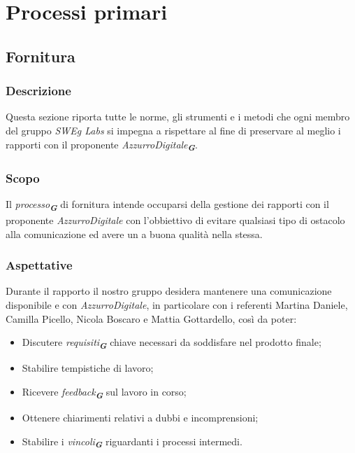 

\section{Processi primari}
\label{sec:processi_primari}
\subsection{Fornitura}
\subsubsection{Descrizione}
Questa sezione riporta tutte le norme, gli strumenti e i metodi che ogni membro del gruppo \emph{SWEg Labs} si impegna a rispettare al fine di preservare al meglio i rapporti con il proponente \emph{AzzurroDigitale}\textsubscript{\textit{\textbf{G}}}.
\subsubsection{Scopo}
Il \emph{processo}\textsubscript{\textit{\textbf{G}}} di fornitura intende occuparsi della gestione dei rapporti con il proponente \emph{AzzurroDigitale} con l’obbiettivo di evitare qualsiasi tipo di ostacolo alla comunicazione ed avere un a buona qualità nella stessa.
\subsubsection{Aspettative}
Durante il rapporto il nostro gruppo desidera mantenere una comunicazione disponibile e con \emph{AzzurroDigitale}, in particolare con i referenti Martina Daniele, Camilla Picello, Nicola Boscaro e Mattia Gottardello, così da poter:
\begin{itemize}
    \item Discutere \emph{requisiti}\textsubscript{\textit{\textbf{G}}} chiave necessari da soddisfare nel prodotto finale;
    \item Stabilire tempistiche di lavoro;
    \item Ricevere \emph{feedback}\textsubscript{\textit{\textbf{G}}} sul lavoro in corso;
    \item Ottenere chiarimenti relativi a dubbi e incomprensioni;
    \item Stabilire i \emph{vincoli}\textsubscript{\textit{\textbf{G}}} riguardanti i processi intermedi.
\end{itemize}
